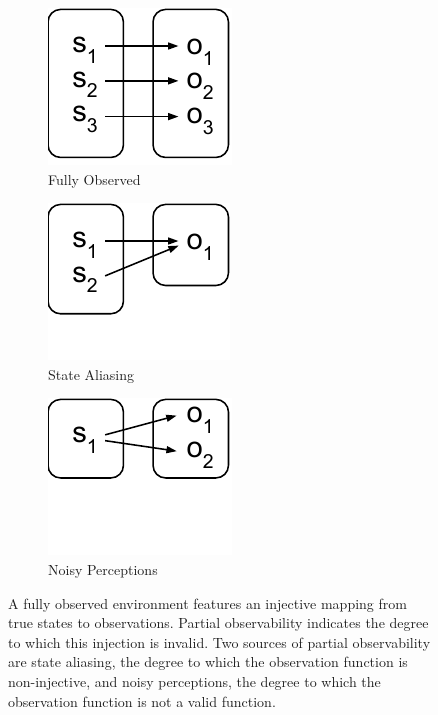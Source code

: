 \documentclass{article} %
\theoremstyle{definition}
\begin{document}
\begin{figure}[htp]
\centering
\begin{subfigure}{.3\textwidth}
  \centering
  \includegraphics[width=.6\linewidth]{figures/bijection}
  \caption{Fully Observed}
  \label{fig:bijection}
\end{subfigure}
\begin{subfigure}{.3\textwidth}
  \centering
  \includegraphics[width=.6\linewidth]{figures/state-aliasing}
  \caption{State Aliasing}
  \label{fig:state-aliasing}
\end{subfigure}
\begin{subfigure}{.3\textwidth}
  \centering
  \includegraphics[width=.6\linewidth]{figures/noisy-perception}
  \caption{Noisy Perceptions}
  \label{fig:noisy-perception}
\end{subfigure}
\caption{A fully observed environment features an injective mapping
  from true states to observations. Partial observability indicates
  the degree to which this injection is invalid. Two sources of
  partial observability are state aliasing, the degree to which the
  observation function is non-injective, and noisy perceptions, the
  degree to which the observation function is not a valid function.}
\label{fig:functions}
\end{figure}
\end{document}
